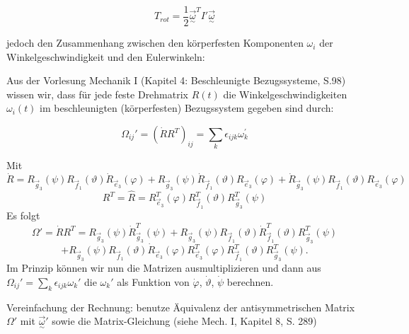 \documentclass[10pt, letterpaper]{article}
\begin{document}
\[T_{rot} = \frac{1}{2} \vec{\underset{\sim}{\omega}}^T I' \vec{\underset{\sim}{\omega}}\]

jedoch den Zusammenhang zwischen den körperfesten Komponenten $\omega_i$ der Winkelgeschwindigkeit und den Eulerwinkeln:

Aus der Vorlesung Mechanik I (Kapitel 4: Beschleunigte Bezugssysteme, S.98) wissen wir, dass für jede feste Drehmatrix $R(t)$ die Winkelgeschwindigkeiten $\omega_i(t)$ im beschleunigten (körperfesten) Bezugssystem gegeben sind durch:

\[\Omega_{ij}' = (\dot{R}R^T)_{ij} = \sum_k \epsilon_{ijk} \omega_k^\prime\]

Mit 
$$\dot{R} = R_{\vec{g}_3}(\psi) R_{\vec{f}_1}(\vartheta) \dot{R}_{\vec{e}_3}(\varphi) + R_{\vec{g}_3}(\psi) \dot{R}_{\vec{f}_1}(\vartheta) R_{\vec{e}_3}(\varphi) + \dot{R}_{\vec{g}_3}(\psi) R_{\vec{f}_1}(\vartheta) R_{\vec{e}_3}(\varphi)$$
$$R^T = \hat{R} = R_{\vec{e}_3}^T(\varphi) R_{\vec{f}_1}^T(\vartheta) R_{\vec{g}_3}^T(\psi)$$
Es folgt
\[\Omega' = \dot{R}R^T = R_{\vec{g}_3}(\psi) \dot{R}_{\vec{g}_3}^T(\psi) + R_{\vec{g}_3}(\psi)R_{\vec{f}_1}(\vartheta) \dot{R}_{\vec{f}_1}^T(\vartheta) R_{\vec{g}_3}^T(\psi)\]
\[+ R_{\vec{g}_3}(\psi) R_{\vec{f}_1}(\vartheta) \dot{R}_{\vec{e}_3}(\varphi) R_{\vec{e}_3}^T(\varphi) R_{\vec{f}_1}^T(\vartheta) R_{\vec{g}_3}^T(\psi).\]
Im Prinzip können wir nun die Matrizen ausmultiplizieren und dann aus $\Omega_{ij}' = \sum_k \epsilon_{ijk} \omega_k'$ die $\omega_k'$ als Funktion von $\dot{\varphi}$, $\dot{\vartheta}$, $\dot{\psi}$ berechnen.

Vereinfachung der Rechnung: benutze Äquivalenz der antisymmetrischen Matrix $\Omega'$ mit $\vec{\underset{\sim}{\omega}}'$ sowie die Matrix-Gleichung (siehe Mech. I, Kapitel 8, S. 289)
\end{document}
